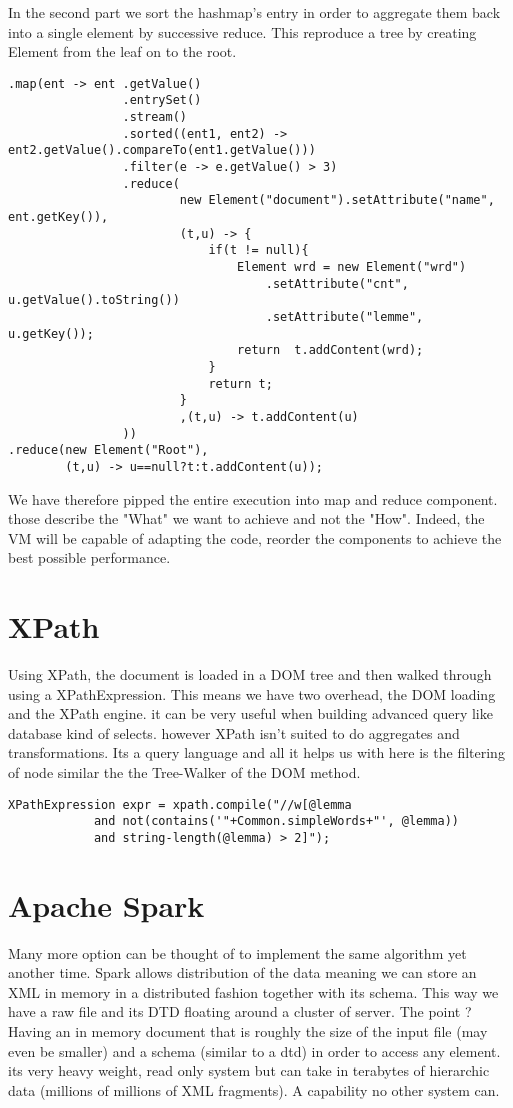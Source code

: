 \documentclass{article}
\begin{document}
In the second part we sort the hashmap's entry in order to aggregate them back into a single element by successive reduce. This reproduce a tree by creating Element from the leaf on to the root. 
\begin{verbatim}
.map(ent -> ent	.getValue()
                .entrySet()
                .stream()
                .sorted((ent1, ent2) -> ent2.getValue().compareTo(ent1.getValue()))
                .filter(e -> e.getValue() > 3)
                .reduce(
                        new Element("document").setAttribute("name", ent.getKey()),
                        (t,u) -> {
                            if(t != null){
                                Element wrd = new Element("wrd")
                                    .setAttribute("cnt", u.getValue().toString())
                                    .setAttribute("lemme", u.getKey());
                                return  t.addContent(wrd);
                            }
                            return t;
                        }
                        ,(t,u) -> t.addContent(u)
                ))
.reduce(new Element("Root"),
        (t,u) -> u==null?t:t.addContent(u));
\end{verbatim}

We have therefore pipped the entire execution into map and reduce component. those describe the "What" we want to achieve and not the "How". Indeed, the VM will be capable of adapting the code, reorder the components to achieve the best possible performance.

\section*{XPath}
Using XPath, the document is loaded in a DOM tree and then walked through using a XPathExpression.
This means we have two overhead, the DOM loading and the XPath engine. it can be very useful when building advanced query like database kind of selects. however XPath isn't suited to do aggregates and transformations. Its a query language and all it helps us with here is the filtering of node similar the the Tree-Walker of the DOM method.
\begin{verbatim}
XPathExpression expr = xpath.compile("//w[@lemma 
            and not(contains('"+Common.simpleWords+"', @lemma))
            and string-length(@lemma) > 2]");
\end{verbatim}

\section*{Apache Spark}
Many more option can be thought of to implement the same algorithm yet another time. Spark allows distribution of the data meaning we can store an XML in memory in a distributed fashion together with its schema. This way we have a raw file and its DTD floating around a cluster of server. The point ? Having an in memory document that is roughly the size of the input file (may even be smaller) and a schema (similar to a dtd) in order to access any element. its very heavy weight, read only system but can take in terabytes of hierarchic data (millions of millions of XML fragments). A capability no other system can.
\end{document}
